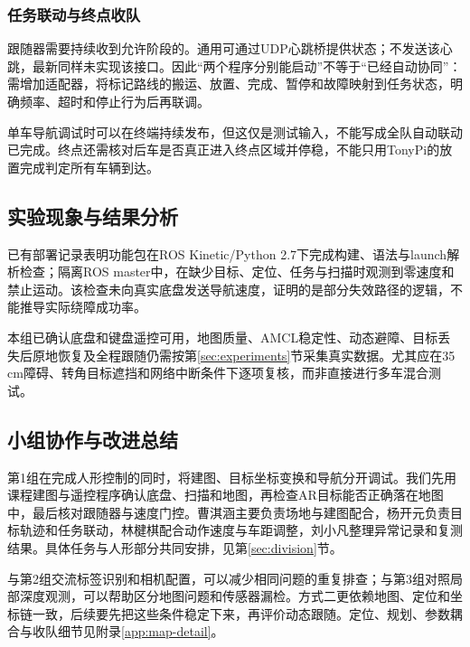 \subsubsection{任务联动与终点收队}
跟随器需要持续收到允许阶段的。通用可通过UDP心跳桥提供状态；不发送该心跳，最新同样未实现该接口。因此“两个程序分别能启动”不等于“已经自动协同”：需增加适配器，将标记路线的搬运、放置、完成、暂停和故障映射到任务状态，明确频率、超时和停止行为后再联调。

单车导航调试时可以在终端持续发布，但这仅是测试输入，不能写成全队自动联动已完成。终点还需核对后车是否真正进入终点区域并停稳，不能只用TonyPi的放置完成判定所有车辆到达。

\subsection{实验现象与结果分析}
已有部署记录表明功能包在ROS Kinetic/Python 2.7下完成构建、语法与launch解析检查；隔离ROS master中，在缺少目标、定位、任务与扫描时观测到零速度和禁止运动。该检查未向真实底盘发送导航速度，证明的是部分失效路径的逻辑，不能推导实际绕障成功率。

本组已确认底盘和键盘遥控可用，地图质量、AMCL稳定性、动态避障、目标丢失后原地恢复及全程跟随仍需按第\ref{sec:experiments}节采集真实数据。尤其应在35\,cm障碍、转角目标遮挡和网络中断条件下逐项复核，而非直接进行多车混合测试。

\subsection{小组协作与改进总结}
第1组在完成人形控制的同时，将建图、目标坐标变换和导航分开调试。我们先用课程建图与遥控程序确认底盘、扫描和地图，再检查AR目标能否正确落在地图中，最后核对跟随器与速度门控。曹淇涵主要负责场地与建图配合，杨开元负责目标轨迹和任务联动，林楗棋配合动作速度与车距调整，刘小凡整理异常记录和复测结果。具体任务与人形部分共同安排，见第\ref{sec:division}节。

与第2组交流标签识别和相机配置，可以减少相同问题的重复排查；与第3组对照局部深度观测，可以帮助区分地图问题和传感器漏检。方式二更依赖地图、定位和坐标链一致，后续要先把这些条件稳定下来，再评价动态跟随。定位、规划、参数耦合与收队细节见附录\ref{app:map-detail}。
